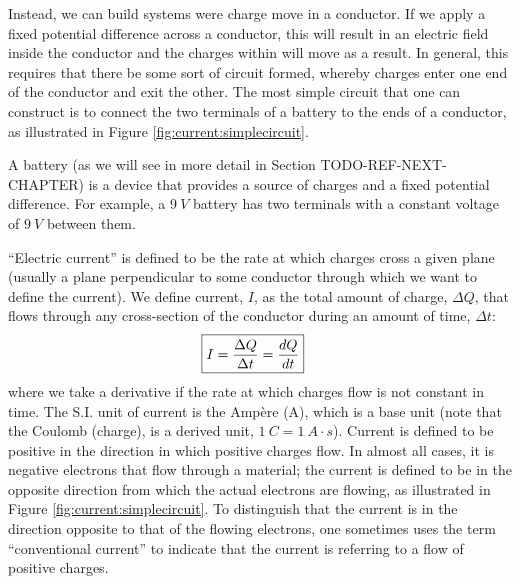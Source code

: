 Instead, we can build systems were charge move in a conductor. If we apply a fixed potential difference across a conductor, this will result in an electric field inside the conductor and the charges within will move as a result. In general, this requires that there be some sort of circuit formed, whereby charges enter one end of the conductor and exit the other. The most simple circuit that one can construct is to  connect the two terminals of a battery to the ends of a conductor, as illustrated in Figure \ref{fig:current:simplecircuit}. 

A battery (as we will see in more detail in Section TODO-REF-NEXT-CHAPTER) is a device that provides a source of charges and a fixed potential difference. For example, a $\SI{9}{V}$ battery has two terminals with a constant voltage of $\SI{9}{V}$ between them.


``Electric current'' is defined to be the rate at which charges cross a given plane (usually a plane perpendicular to some conductor through which we want to define the current). We define current, $I$, as the total amount of charge, $\Delta Q$, that flows through any cross-section of the conductor during an amount of time, $\Delta t$:
\begin{align*}
\Aboxed{I=\frac{\Delta Q}{\Delta t}=\frac{dQ}{dt}}
\end{align*}
where we take a derivative if the rate at which charges flow is not constant in time. The S.I. unit of current is the Amp\`ere (\si{A}), which is a base unit (note that the Coulomb (charge), is a derived unit, $\SI{1}{C}=\SI{1}{A\cdot s}$). Current is defined to be positive in the direction in which positive charges flow. In almost all cases, it is negative electrons that flow through a material; the current is defined to be in the opposite direction from which the actual electrons are flowing, as illustrated in Figure \ref{fig:current:simplecircuit}. To distinguish that the current is in the direction opposite to that of the flowing electrons, one sometimes uses the term ``conventional current'' to indicate that the current is referring to a flow of positive charges.

